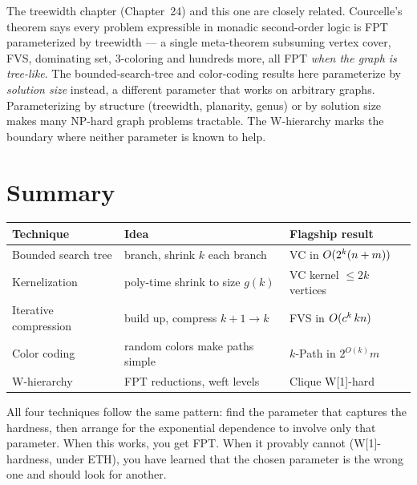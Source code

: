\begin{connectionbox}
The treewidth chapter (Chapter~24) and this one are closely related. Courcelle's theorem says every problem expressible in monadic second-order logic is FPT parameterized by treewidth --- a single meta-theorem subsuming vertex cover, FVS, dominating set, $3$-coloring and hundreds more, all FPT \emph{when the graph is tree-like}. The bounded-search-tree and color-coding results here parameterize by \emph{solution size} instead, a different parameter that works on arbitrary graphs. Parameterizing by structure (treewidth, planarity, genus) or by solution size makes many NP-hard graph problems tractable. The W-hierarchy marks the boundary where neither parameter is known to help.
\end{connectionbox}

\section*{Summary}

\begin{center}
\begin{tabular}{lll}
\toprule
Technique & Idea & Flagship result \\
\midrule
Bounded search tree & branch, shrink $k$ each branch & VC in $O(2^k(n+m))$ \\
Kernelization & poly-time shrink to size $g(k)$ & VC kernel $\le 2k$ vertices \\
Iterative compression & build up, compress $k{+}1\!\to\!k$ & FVS in $O(c^k\,kn)$ \\
Color coding & random colors make paths simple & $k$-Path in $2^{O(k)}m$ \\
W-hierarchy & FPT reductions, weft levels & Clique W[1]-hard \\
\bottomrule
\end{tabular}
\end{center}

All four techniques follow the same pattern: find the parameter that captures the hardness, then arrange for the exponential dependence to involve only that parameter. When this works, you get FPT. When it provably cannot (W[1]-hardness, under ETH), you have learned that the chosen parameter is the wrong one and should look for another.

